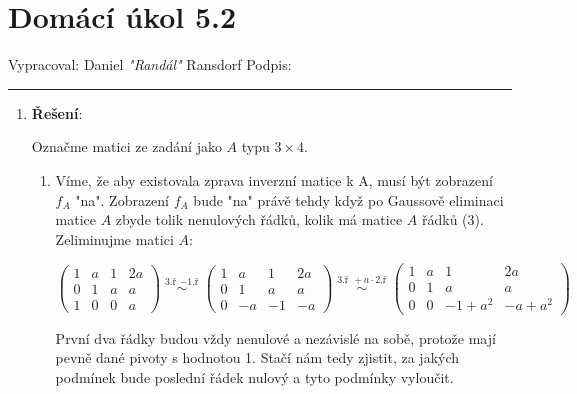 \documentclass[12pt]{article}
\begin{document}
\section*{Domácí úkol 5.2}

Vypracoval: Daniel \textit{"Randál"} Ransdorf \hfill Podpis: \rule{4cm}{0.4pt}

\begin{enumerate}
      \item \textbf{Řešení}:

      Označme matici ze zadání jako $A$ typu $3 \times 4$.
      
      \begin{enumerate}
        \item Víme, že aby existovala zprava inverzní matice k A, musí být zobrazení $f_A$ "na".
          Zobrazení $f_A$ bude "na" právě tehdy když po Gaussově eliminaci matice $A$ zbyde
          tolik nenulových řádků, kolik má matice $A$ řádků (3).
          Zeliminujme matici $A$:

          \[
            \left(\begin{array}{cccc}
              1&a&1&2a \\ 0&1&a&a \\ 1&0&0&a
            \end{array}\right)
            \overset{\text{3.ř } -\text{1.ř}}{\;\sim\;}
            \left(\begin{array}{cccc}
              1&a&1&2a \\ 0&1&a&a \\ 0&-a&-1&-a
            \end{array}\right)
            \overset{\text{3.ř } + a\cdot\text{2.ř}}{\;\sim\;}
            \left(\begin{array}{cccc}
              1&a&1&2a \\ 0&1&a&a \\ 0&0&-1+a^2&-a+a^2
            \end{array}\right)
          \]

          První dva řádky budou vždy nenulové a nezávislé na sobě,
          protože mají pevně dané pivoty s hodnotou 1.
          Stačí nám tedy zjistit, za jakých podmínek bude poslední řádek nulový a tyto podmínky vyloučit.
          

\end{enumerate}
\end{enumerate}
\end{document}
